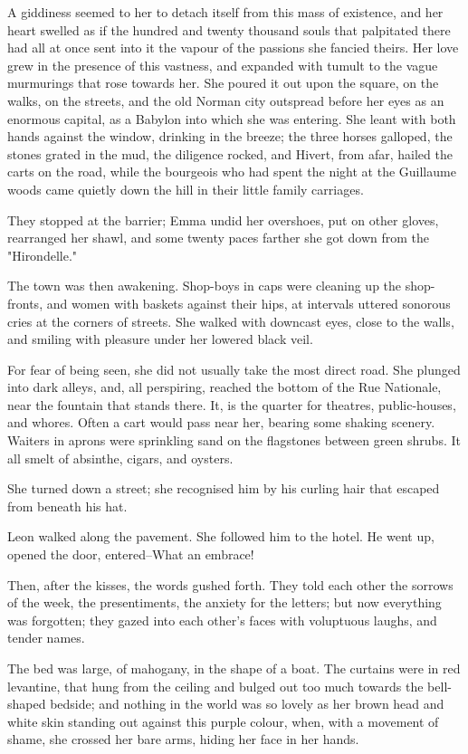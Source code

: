 \documentclass[11pt,twocolumn]{ltugboat}
\begin{document}
A giddiness seemed to her to detach itself from this mass of existence,
and her heart swelled as if the hundred and twenty thousand souls that
palpitated there had all at once sent into it the vapour of the passions
she fancied theirs. Her love grew in the presence of this vastness, and
expanded with tumult to the vague murmurings that rose towards her. She
poured it out upon the square, on the walks, on the streets, and the
old Norman city outspread before her eyes as an enormous capital, as a
Babylon into which she was entering. She leant with both hands against
the window, drinking in the breeze; the three horses galloped, the
stones grated in the mud, the diligence rocked, and Hivert, from afar,
hailed the carts on the road, while the bourgeois who had spent the
night at the Guillaume woods came quietly down the hill in their little
family carriages.

They stopped at the barrier; Emma undid her overshoes, put on other
gloves, rearranged her shawl, and some twenty paces farther she got down
from the "Hirondelle."

The town was then awakening. Shop-boys in caps were cleaning up the
shop-fronts, and women with baskets against their hips, at intervals
uttered sonorous cries at the corners of streets. She walked with
downcast eyes, close to the walls, and smiling with pleasure under her
lowered black veil.

For fear of being seen, she did not usually take the most direct road.
She plunged into dark alleys, and, all perspiring, reached the bottom
of the Rue Nationale, near the fountain that stands there. It, is the
quarter for theatres, public-houses, and whores. Often a cart would
pass near her, bearing some shaking scenery. Waiters in aprons were
sprinkling sand on the flagstones between green shrubs. It all smelt of
absinthe, cigars, and oysters.

She turned down a street; she recognised him by his curling hair that
escaped from beneath his hat.

Leon walked along the pavement. She followed him to the hotel. He went
up, opened the door, entered--What an embrace!

Then, after the kisses, the words gushed forth. They told each other the
sorrows of the week, the presentiments, the anxiety for the letters; but
now everything was forgotten; they gazed into each other's faces with
voluptuous laughs, and tender names.

The bed was large, of mahogany, in the shape of a boat. The curtains
were in red levantine, that hung from the ceiling and bulged out too
much towards the bell-shaped bedside; and nothing in the world was so
lovely as her brown head and white skin standing out against this purple
colour, when, with a movement of shame, she crossed her bare arms,
hiding her face in her hands.
\end{document}
